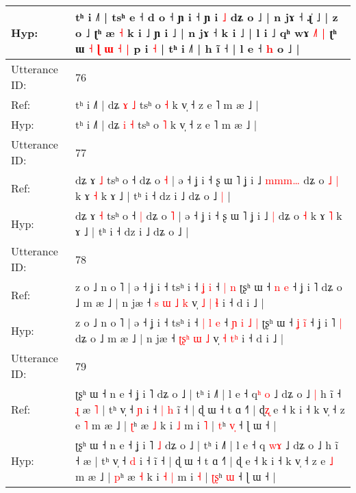 \documentclass[10pt]{article}
\DeclareRobustCommand{\hl}[1]{{\textcolor{red}{#1}}}
\begin{document}
\begin{longtable}{ll}
 \\
Hyp: & tʰ i ˩˥ | tsʰ e ˧ d o ˧ ɲ i ˧ ɲ i \hl{˩} dʑ o ˩ | n jɤ ˧ ɻ̍ ˩ |\hl{}\hl{}\hl{}\hl{}\hl{}\hl{}\hl{} z o ˩ ʈʰ æ \hl{˧} k i ˩ ɲ i ˩ | n jɤ ˧ k i ˩ | l i ˩ qʰ wɤ \hl{˩}˥\hl{ }\hl{|} ʈʰ ɯ \hl{˧} \hl{}\hl{ɭ} \hl{ɯ} \hl{}\hl{˧} \hl{|} p i \hl{˧} | tʰ i ˩˥ | h ĩ ˧ | l e ˧ \hl{}\hl{h} o ˩ |
 \\
\midrule
Utterance ID: & 76 \\
Ref: & tʰ i ˩˥ | dʑ \hl{ɤ} \hl{˩} tsʰ o \hl{˧} k v̩ ˧ z e ˥ m æ ˩ |
 \\
Hyp: & tʰ i ˩˥ | dʑ \hl{i} \hl{˧} tsʰ o \hl{˥} k v̩ ˧ z e ˥ m æ ˩ |
 \\
\midrule
Utterance ID: & 77 \\
Ref: & dʑ ɤ \hl{˩} tsʰ o ˧\hl{}\hl{} dʑ o \hl{˧} | ə ˧ ʝ i ˧ ʂ ɯ ˥ ʝ i ˩ \hl{m}\hl{m}\hl{m}\hl{…} dʑ o\hl{ }\hl{˩} \hl{|} k ɤ \hl{˧} k ɤ ˩ | tʰ i ˧ dz i ˩ dʑ o ˩\hl{ }\hl{|} |
 \\
Hyp: & dʑ ɤ \hl{˧} tsʰ o ˧\hl{ }\hl{|} dʑ o \hl{˥} | ə ˧ ʝ i ˧ ʂ ɯ ˥ ʝ i ˩ \hl{}\hl{}\hl{}\hl{|} dʑ o\hl{}\hl{} \hl{˧} k ɤ \hl{˥} k ɤ ˩ | tʰ i ˧ dz i ˩ dʑ o ˩\hl{}\hl{} |
 \\
\midrule
Utterance ID: & 78 \\
Ref: & z o ˩ n o ˥ | ə ˧ ʝ i ˧ tsʰ i ˧\hl{}\hl{} \hl{ʝ} \hl{i} ˧\hl{}\hl{}\hl{}\hl{} \hl{|} \hl{n} ʈʂʰ ɯ ˧ \hl{n} \hl{}\hl{e} ˧ ʝ i ˥\hl{}\hl{} dʑ o ˩ m æ ˩ | n jæ ˧ \hl{s}\hl{ }\hl{ɯ} \hl{˩} \hl{k} v̩ \hl{˩} \hl{|}\hl{ }\hl{ɬ} i ˧ d i ˩ |
 \\
Hyp: & z o ˩ n o ˥ | ə ˧ ʝ i ˧ tsʰ i ˧\hl{ }\hl{|} \hl{l} \hl{e} ˧\hl{ }\hl{ɲ}\hl{ }\hl{i} \hl{˩} \hl{|} ʈʂʰ ɯ ˧ \hl{ʝ} \hl{i}\hl{̃} ˧ ʝ i ˥\hl{ }\hl{|} dʑ o ˩ m æ ˩ | n jæ ˧ \hl{ʈ}\hl{ʂ}\hl{ʰ} \hl{ɯ} \hl{˩} v̩ \hl{˧} \hl{}\hl{t}\hl{ʰ} i ˧ d i ˩ |
 \\
\midrule
Utterance ID: & 79 \\
Ref: & ʈʂʰ ɯ ˧ n e ˧ ʝ i ˥\hl{}\hl{} dʑ o ˩ | tʰ i ˩˥ | l e ˧ q\hl{ʰ}\hl{ }\hl{o} ˩ dʑ o ˩\hl{ }\hl{|} h ĩ ˧\hl{ }\hl{ɻ} æ\hl{ }\hl{˥} | tʰ v̩ ˧ \hl{ɲ} i ˧\hl{ }\hl{|}\hl{ }\hl{h} ĩ ˧ | ɖ ɯ ˧ t ɑ ˧˥ | ɖ\hl{ʐ} e ˧ k i ˧ k v̩ ˧ z e \hl{˥} m æ ˩ | \hl{ʈ}ʰ æ \hl{˩} k i\hl{}\hl{} \hl{˩} m i \hl{˥} | \hl{}\hl{t}ʰ \hl{v}\hl{̩} ˧ ɭ ɯ ˧ |
 \\
Hyp: & ʈʂʰ ɯ ˧ n e ˧ ʝ i ˥\hl{ }\hl{˩} dʑ o ˩ | tʰ i ˩˥ | l e ˧ q\hl{ }\hl{w}\hl{ɤ} ˩ dʑ o ˩\hl{}\hl{} h ĩ ˧\hl{}\hl{} æ\hl{}\hl{} | tʰ v̩ ˧ \hl{d} i ˧\hl{}\hl{}\hl{}\hl{} ĩ ˧ | ɖ ɯ ˧ t ɑ ˧˥ | ɖ\hl{} e ˧ k i ˧ k v̩ ˧ z e \hl{˩} m æ ˩ | \hl{p}ʰ æ \hl{˧} k i\hl{ }\hl{˧} \hl{|} m i \hl{˧} | \hl{ʈ}\hl{ʂ}ʰ \hl{}\hl{ɯ} ˧ ɭ ɯ ˧ |

\end{longtable}
\end{document}
